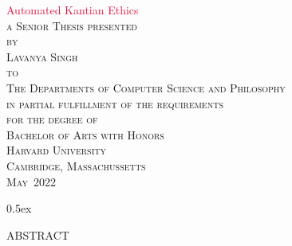 \documentclass[11pt,a4paper]{article}
\begin{document}

\renewcommand{\maketitle}{
    \pagenumbering{roman}
    \setcounter{page}{1}
	\thispagestyle{empty}
	\vspace*{\fill}
	\vspace{100pt}
	\begin{center}
	\Huge \textcolor{crimson}{Automated Kantian Ethics} \normalsize \\
	\vspace{100pt}
	\textsc{a Senior Thesis presented \\ by\\
	Lavanya Singh\\ to\\ The Departments of Computer Science and Philosophy\\
	\vspace{12pt}
	in partial fulfillment of the requirements\\
	for the degree of\\ Bachelor of Arts with Honors \\
	\vspace{12pt}
	Harvard University\\ Cambridge, Massachussetts\\
	May\ 2022}
	\end{center} \vspace*{\fill}
}
\maketitle
{}
\newpage

\tableofcontents

\newpage 
\parskip 0.5ex
\doublespacing

\begin{center}
\textsc{ABSTRACT} \\
\end{center}



\newpage
{}

\newpage 

\newpage

\newpage 

\newpage

\newpage
\begin{appendices}


\end{appendices}


\newpage

\end{document}
